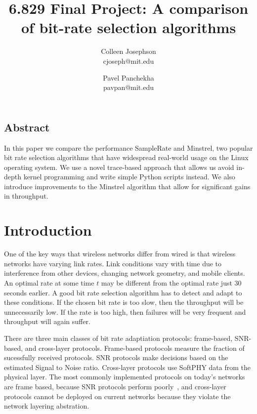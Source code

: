 \documentclass[letterpaper,twocolumn,10pt]{article}
\begin{document}

\title{\Large \bf 6.829 Final Project: A comparison of bit-rate selection algorithms}
\author{
{\rm Colleen Josephson}\\
cjoseph@mit.edu
\and
{\rm Pavel Panchekha}\\
pavpan@mit.edu
} %


\maketitle


\subsection*{Abstract}
In this paper we compare the performance SampleRate and Minstrel, two popular bit rate selection algorithms that have widespread real-world usage on the Linux operating system. We use a novel trace-based approach that allows us avoid in-depth kernel programming and write simple Python scripts instead. We also introduce improvements to the Minstrel algorithm that allow for significant gains in throughput. 
\section{Introduction}

One of the key ways that wireless networks differ from wired is that wireless networks have varying link rates. Link conditions vary with time due to interference from other devices, changing network geometry, and mobile clients. An optimal rate at some time $t$ may be different from the optimal rate just 30 seconds earlier. A good bit rate selection algorithm has to detect and adapt to these conditions. If the chosen bit rate is too slow, then the throughput will be unnecessarily low. If the rate is too high, then failures will be very frequent and throughput will again suffer. 

There are three main classes of bit rate adaptiation protocols: frame-based, SNR-based, and cross-layer protocols. Frame-based protocols measure the fraction of sucessfully received protocols. SNR protocols make decisions based on the estimated Signal to Noise ratio. Cross-layer protocols use SoftPHY data from the physical layer. The most commonly implemented protocols on today's networks are frame based, because SNR protocols perform poorly~\cite{samplerate}, and cross-layer protocols cannot be deployed on current networks because they violate the network layering abstration. 
\end{document}
